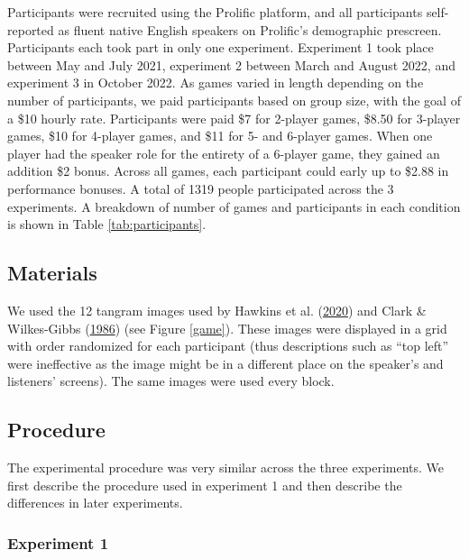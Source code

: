\documentclass[
  english,
  a4paper,
]{article}
\begin{document}
Participants were recruited using the Prolific platform, and all participants self-reported as fluent native English speakers on Prolific's demographic prescreen. Participants each took part in only one experiment. Experiment 1 took place between May and July 2021, experiment 2 between March and August 2022, and experiment 3 in October 2022. As games varied in length depending on the number of participants, we paid participants based on group size, with the goal of a \$10 hourly rate. Participants were paid \$7 for 2-player games, \$8.50 for 3-player games, \$10 for 4-player games, and \$11 for 5- and 6-player games. When one player had the speaker role for the entirety of a 6-player game, they gained an addition \$2 bonus. Across all games, each participant could early up to \$2.88 in performance bonuses. A total of 1319 people participated across the 3 experiments. A breakdown of number of games and participants in each condition is shown in Table \ref{tab:participants}.

\hypertarget{materials}{%
\subsection{Materials}\label{materials}}

We used the 12 tangram images used by Hawkins et al. (\protect\hyperlink{ref-hawkinsCharacterizingDynamicsLearning2020}{2020}) and Clark \& Wilkes-Gibbs (\protect\hyperlink{ref-clarkReferringCollaborativeProcess1986}{1986}) (see Figure \ref{game}). These images were displayed in a grid with order randomized for each participant (thus descriptions such as ``top left'' were ineffective as the image might be in a different place on the speaker's and listeners' screens). The same images were used every block.

\hypertarget{procedure}{%
\subsection{Procedure}\label{procedure}}

The experimental procedure was very similar across the three experiments. We first describe the procedure used in experiment 1 and then describe the differences in later experiments.

\hypertarget{experiment-1}{%
\subsubsection{Experiment 1}\label{experiment-1}}
\end{document}
